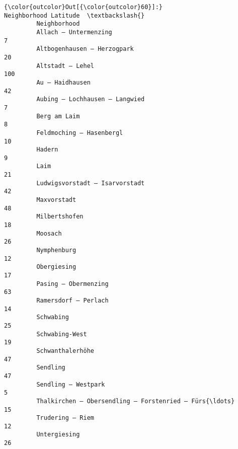 \documentclass[11pt]{article}
\begin{document}
\begin{Verbatim}[commandchars=\\\{\}]
{\color{outcolor}Out[{\color{outcolor}60}]:}                                                     Neighborhood Latitude  \textbackslash{}
         Neighborhood                                                                
         Allach – Untermenzing                                                   7   
         Altbogenhausen – Herzogpark                                            20   
         Altstadt – Lehel                                                      100   
         Au – Haidhausen                                                        42   
         Aubing – Lochhausen – Langwied                                          7   
         Berg am Laim                                                            8   
         Feldmoching – Hasenbergl                                               10   
         Hadern                                                                  9   
         Laim                                                                   21   
         Ludwigsvorstadt – Isarvorstadt                                         42   
         Maxvorstadt                                                            48   
         Milbertshofen                                                          18   
         Moosach                                                                26   
         Nymphenburg                                                            12   
         Obergiesing                                                            17   
         Pasing – Obermenzing                                                   63   
         Ramersdorf – Perlach                                                   14   
         Schwabing                                                              25   
         Schwabing-West                                                         19   
         Schwanthalerhöhe                                                       47   
         Sendling                                                               47   
         Sendling – Westpark                                                     5   
         Thalkirchen – Obersendling – Forstenried – Fürs{\ldots}                     15   
         Trudering – Riem                                                       12   
         Untergiesing                                                           26   
         

\end{Verbatim}
\end{document}
